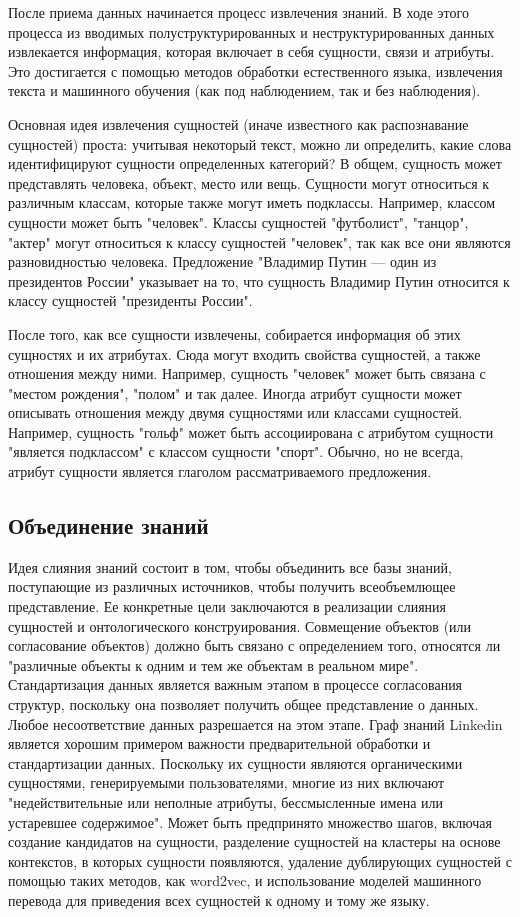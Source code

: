 После приема данных начинается процесс извлечения знаний. В ходе этого процесса из вводимых полуструктурированных и неструктурированных данных извлекается информация, которая включает в себя сущности, связи и атрибуты. Это достигается с помощью методов обработки естественного языка, извлечения текста и машинного обучения (как под наблюдением, так и без наблюдения).

Основная идея извлечения сущностей (иначе известного как распознавание сущностей) проста: учитывая некоторый текст, можно ли определить, какие слова идентифицируют сущности определенных категорий? В общем, сущность может представлять человека, объект, место или вещь. Сущности могут относиться к различным классам, которые также могут иметь подклассы. Например, классом сущности может быть "человек". Классы сущностей "футболист", "танцор", "актер" могут относиться к классу сущностей "человек", так как все они являются разновидностью человека. Предложение "Владимир Путин — один из президентов России" указывает на то, что сущность Владимир Путин относится к классу сущностей "президенты России".

После того, как все сущности извлечены, собирается информация об этих сущностях и их атрибутах. Сюда могут входить свойства сущностей, а также отношения между ними. Например, сущность "человек" может быть связана с "местом рождения", "полом" и так далее. Иногда атрибут сущности может описывать отношения между двумя сущностями или классами сущностей. Например, сущность "гольф" может быть ассоциирована с атрибутом сущности "является подклассом" с классом сущности "спорт". Обычно, но не всегда, атрибут сущности является глаголом рассматриваемого предложения.

\subsection{Объединение знаний}

Идея слияния знаний состоит в том, чтобы объединить все базы знаний, поступающие из различных источников, чтобы получить всеобъемлющее представление. Ее конкретные цели заключаются в реализации слияния сущностей и онтологического конструирования. Совмещение объектов (или согласование объектов) должно быть связано с определением того, относятся ли "различные объекты к одним и тем же объектам в реальном мире". Стандартизация данных является важным этапом в процессе согласования структур, поскольку она позволяет получить общее представление о данных. Любое несоответствие данных разрешается на этом этапе. Граф знаний Linkedin является хорошим примером важности предварительной обработки и стандартизации данных. Поскольку их сущности являются органическими сущностями, генерируемыми пользователями, многие из них включают "недействительные или неполные атрибуты, бессмысленные имена или устаревшее содержимое". Может быть предпринято множество шагов, включая создание кандидатов на сущности, разделение сущностей на кластеры на основе контекстов, в которых сущности появляются, удаление дублирующих сущностей с помощью таких методов, как word2vec, и использование моделей машинного перевода для приведения всех сущностей к одному и тому же языку.

